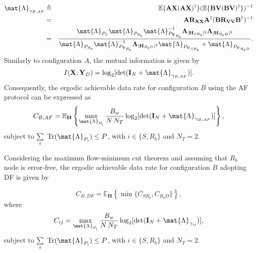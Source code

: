 \begin{eqnarray}
	\mat{\Lambda}_{\gamma_{B,AF}} & \triangleq & \mathbb{E}\{\mathbf{A}\mathbf{X}(\mathbf{A}\mathbf{X})^\dagger\} (\mathbb{E}\{\mathbf{B}\mathbf{V}(\mathbf{B}\mathbf{V})^\dagger\})^{-1} \\
	& = & \mathbf{A} \mathbf{R}_{\mathbf{X}\mathbf{X}} \mathbf{A}^\dagger(\mathbf{B} \mathbf{R}_{\mathbf{V}\mathbf{V}} \mathbf{B}^\dagger)^{-1} \nonumber\\
	& = & \frac{\mat{\Lambda}_{P_{S}} \mat{\Lambda}_{P_{R_{b}}} \mat{\Lambda}_{P_{\mathbf{Y}_{R_{b}}}}^{-1} \mathbf{\Lambda}_{|\mathbf{H}_{SR_b}|^2} \mathbf{\Lambda}_{|\mathbf{H}_{R_{b}D}|^2}}
	{\mat{\Lambda}_{P_{R_{b}}} \mat{\Lambda}_{P_{\mathbf{Y}_{R_{b}}}}^{-1} \mathbf{\Lambda}_{|\mathbf{H}_{R_{b}D}|^2} \mat{\Lambda}_{P_{\mathbf{V}_{SR_{b}}}} + \mat{\Lambda}_{P_{\mathbf{V}_{R_{b}D}}}}.
\end{eqnarray}
Similarly to configuration $A$, the mutual information is given by
\begin{equation}
	I(\mathbf{X};\mathbf{Y}_{D}) = \log_{2} [\text{det}(\mathbf{I}_{N}+ \mat{\Lambda}_{\gamma_{B,AF}})].
\end{equation}
Consequently, the ergodic achievable data rate for configuration $B$ using the \ac{AF} protocol can be expressed as
\begin{equation}\label{eq:cbaf}
	C_{B,AF} = \mathbb{E}_{\mathbf{H}}\left\{\max_{\mat{\Lambda}_{P_{i}}} \dfrac{B_{w}}{N \, N_{T}} \log_{2} [\text{det}(\mathbf{I}_{N}+ \mat{\Lambda}_{\gamma_{B,AF}})]\right\},
\end{equation}
subject to $ \sum\limits_{i} \ \text{Tr}(\mat{\Lambda}_{P_{i}}) \leq P $, with $i \in \{S,R_b\}$ and $ N_T = 2 $.

Considering the maximum flow-minimum cut theorem \cite{Ford1962} and assuming that $R_{b}$ node is error-free, the ergodic achievable data rate for configuration $B$ adopting \ac{DF} is given by

\begin{equation}
	C_{B,DF} = \mathbb{E}_{\mathbf{H}}\left\{\min\{C_{SR_{b}},C_{R_{b}D}\}\right\},
\end{equation}
where
\begin{equation}
	C_{ij} = \max_{\mat{\Lambda}_{P_{i}}} \dfrac{B_{w}}{N \, N_{T}} \log_{2} [\text{det}(\mathbf{I}_{N}+ \mat{\Lambda}_{\gamma_{ij}})],
\end{equation}
subject to $ \sum\limits_{i} \ \text{Tr}(\mat{\Lambda}_{P_{i}}) \leq P $, with $i \in \{S,R_b\}$ and $ N_T = 2 $.

